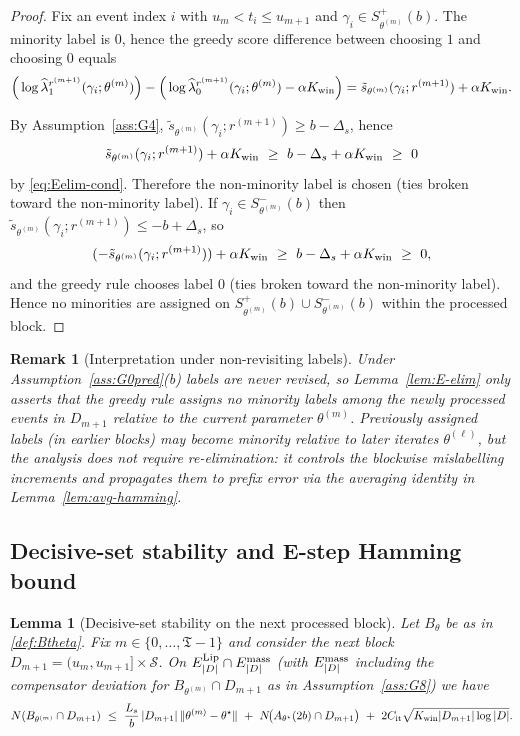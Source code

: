 \documentclass{statsoc}
\newtheorem{lemma}[lemma]{Lemma}
\newtheorem{remark}[remark]{Remark}
\newcommand{\1}{\mathbbm{1}}
\newcommand{\Tmax}{\mathfrak{T}}
\begin{document}
\begin{proof}
Fix an event index $i$ with $u_m<t_i\le u_{m+1}$ and $\gamma_i\in S^+_{\theta^{(m)}}(b)$. The minority label is $0$, hence the greedy score difference between choosing $1$ and choosing $0$ equals
\[
\Big(\log \widehat\lambda_{1}^{r^{(m+1)}}(\gamma_i;\theta^{(m)})\Big)
-\Big(\log \widehat\lambda_{0}^{r^{(m+1)}}(\gamma_i;\theta^{(m)})-\alpha K_{\rm win}\Big)
=\tilde s_{\theta^{(m)}}(\gamma_i;r^{(m+1)})+\alpha K_{\rm win}.
\]

By Assumption~\ref{ass:G4}, $\tilde s_{\theta^{(m)}}(\gamma_i;r^{(m+1)})\ge b-\Delta_s$, hence
\[
\tilde s_{\theta^{(m)}}(\gamma_i;r^{(m+1)})+\alpha K_{\rm win}\ \ge\ b-\Delta_s+\alpha K_{\rm win}\ \ge\ 0
\]
by \eqref{eq:Eelim-cond}. Therefore the non-minority label is chosen (ties broken toward the non-minority label). If $\gamma_i\in S^-_{\theta^{(m)}}(b)$ then $\tilde s_{\theta^{(m)}}(\gamma_i;r^{(m+1)})\le -b+\Delta_s$, so
\[
(-\tilde s_{\theta^{(m)}}(\gamma_i;r^{(m+1)}))+\alpha K_{\rm win}
\ \ge\ b-\Delta_s+\alpha K_{\rm win}\ \ge\ 0,
\]
and the greedy rule chooses label $0$ (ties broken toward the non-minority label). Hence no minorities are assigned on
$S^+_{\theta^{(m)}}(b)\cup S^-_{\theta^{(m)}}(b)$ within the processed block.
\end{proof}

\begin{remark}[Interpretation under non-revisiting labels]\label{rem:no-revisit-meaning}
Under Assumption~\ref{ass:G0pred}(b) labels are never revised, so Lemma~\ref{lem:E-elim} only asserts that the greedy rule assigns no minority labels  among the newly processed events in $D_{m+1}$  relative to the current parameter $\theta^{(m)}$. Previously assigned labels (in earlier blocks) may become minority relative to later iterates $\theta^{(\ell)}$, but the analysis does not require re-elimination: it controls the blockwise mislabelling increments and propagates them to prefix error via the averaging identity in Lemma~\ref{lem:avg-hamming}.
\end{remark}



\subsection{Decisive-set stability and E-step Hamming bound}\label{sec:Estep}


\begin{lemma}[Decisive-set stability on the next processed block]\label{lem:set-stab}
Let $B_\theta$ be as in \cref{def:Btheta}. Fix $m\in\{0,\dots,\Tmax-1\}$ and consider the next block
$D_{m+1}=(u_m,u_{m+1}]\times\mathcal S$.
On $E^{\rm Lip}_{|D|}\cap E^{\rm mass}_{|D|}$ (with $E^{\rm mass}_{|D|}$ including the compensator deviation for
$B_{\theta^{(m)}}\cap D_{m+1}$ as in Assumption~\ref{ass:G8}) we have
\[
N(B_{\theta^{(m)}}\cap D_{m+1})\ \le\ \frac{L_s}{b}\,|D_{m+1}|\,\|\theta^{(m)}-\theta^\star\|
\ +\ N\!\big(A_{\theta^\star}(2b)\cap D_{m+1}\big)\ +\ 2 C_{\rm it}\sqrt{K_{\rm win}|D_{m+1}|\log|D|}.
\]
\end{lemma}
\end{document}
